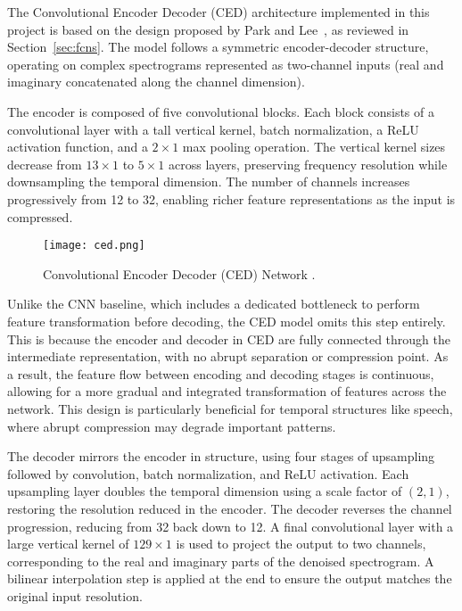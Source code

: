The Convolutional Encoder Decoder (CED) architecture implemented in this project is based on the design proposed by Park and Lee~\cite{park2017acoustic}, as reviewed in Section~\ref{sec:fcns}. The model follows a symmetric encoder-decoder structure, operating on complex spectrograms represented as two-channel inputs (real and imaginary concatenated along the channel dimension).

The encoder is composed of five convolutional blocks. Each block consists of a convolutional layer with a tall vertical kernel, batch normalization, a ReLU activation function, and a \(2 \times 1\) max pooling operation. The vertical kernel sizes decrease from \(13 \times 1\) to \(5 \times 1\) across layers, preserving frequency resolution while downsampling the temporal dimension. The number of channels increases progressively from 12 to 32, enabling richer feature representations as the input is compressed.

\begin{figure}[h]
    \centering
    \texttt{[image: ced.png]}
    \caption{\label{fig:ced}Convolutional Encoder Decoder (CED) Network \cite{park2017acoustic}.}
\end{figure}

Unlike the CNN baseline, which includes a dedicated bottleneck to perform feature transformation before decoding, the CED model omits this step entirely. This is because the encoder and decoder in CED are fully connected through the intermediate representation, with no abrupt separation or compression point. As a result, the feature flow between encoding and decoding stages is continuous, allowing for a more gradual and integrated transformation of features across the network. This design is particularly beneficial for temporal structures like speech, where abrupt compression may degrade important patterns.

The decoder mirrors the encoder in structure, using four stages of upsampling followed by convolution, batch normalization, and ReLU activation. Each upsampling layer doubles the temporal dimension using a scale factor of \((2, 1)\), restoring the resolution reduced in the encoder. The decoder reverses the channel progression, reducing from 32 back down to 12. A final convolutional layer with a large vertical kernel of \(129 \times 1\) is used to project the output to two channels, corresponding to the real and imaginary parts of the denoised spectrogram. A bilinear interpolation step is applied at the end to ensure the output matches the original input resolution.

